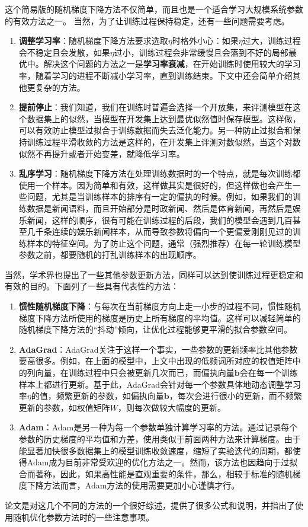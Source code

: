 \documentclass[10pt,a4paper]{ctexart}
\begin{document}
这个简易版的随机梯度下降方法不仅简单，而且也是一个适合学习大规模系统参数的有效方法之一。
当然，为了让训练过程保持稳定，还有一些问题需要考虑。
\begin{enumerate}
\item[] \textbf{调整学习率}：随机梯度下降方法要求选取$\eta$时格外小心：如果$\eta$过大，训练过程会不稳定且会发散，如果$\eta$过小，训练过程会非常缓慢且会落到不好的局部最优中。解决这个问题的方法之一是\textbf{学习率衰减}，在开始训练时使用较大的学习率，随着学习的进程不断减小学习率，直到训练结束。下文中还会简单介绍其他更复杂的方法。
\item[] \textbf{提前停止}：我们知道，我们在训练时普遍会选择一个开放集，来评测模型在这个数据集上的似然，当模型在开发集上达到最优似然值时保存模型。这样做，可以有效防止模型过拟合于训练数据而失去泛化能力。另一种防止过拟合和保持训练过程平滑收敛的方法是这样的，在开发集上评测对数似然，当这个对数似然不再提升或者开始变差，就降低学习率。
\item[] \textbf{乱序学习}：随机梯度下降方法在处理训练数据时的一个特点，就是每次训练都使用一个样本。因为简单和有效，这样做其实是很好的，但这样做也会产生一些问题，尤其是当训练样本的排序有一定的偏执的时候。例如，如果我们的训练数据是新闻语料，而且开始部分是时政新闻、然后是体育新闻，再然后是娱乐新闻，这样的顺序，很有可能在训练过程的后段，我们的模型会遇到几百甚至几千条连续的娱乐新闻样本，从而导致参数将偏向一个更偏爱刚刚见过的训练样本的特征空间。为了防止这个问题，通常（强烈推荐）在每一轮训练模型参数之前，都要随机的打乱训练样本的出现顺序。
\end{enumerate}

当然，学术界也提出了一些其他参数更新方法，同样可以达到使训练过程更稳定和有效的目的。下面列了一些具有代表性的方法：
\begin{enumerate}
\item[] \textbf{惯性随机梯度下降\cite{holyoak1987parallel}}：与每次在当前梯度方向上走一小步的过程不同，惯性随机梯度下降方法所使用的梯度是历史上所有梯度的平均值。这样可以减轻简单的随机梯度下降方法的“抖动”倾向，让优化过程能够更平滑的拟合参数空间。
\item[] \textbf{AdaGrad\cite{duchi2011adaptive}}：AdaGrad关注于这样一个事实，一些参数的更新频率比其他参数要高很多。例如，在上面的模型中，上文中出现的低频词所对应的权值矩阵中的列向量，在训练过程中只会被更新几次而已，而偏执向量$\textbf{b}$会在每一个训练样本上都进行更新。基于此，AdaGrad会针对每一个参数具体地动态调整学习率$\eta$的值，频繁更新的参数，如偏执向量$\textbf{b}$，每次会进行很小的更新，而不频繁更新的参数，如权值矩阵$W$，则每次做较大幅度的更新。
\item[] \textbf{Adam\cite{kingma2014adam}}：Adam是另一种为每一个参数单独计算学习率的方法。通过记录每个参数的历史梯度的平均值和方差，使用类似于前面两种方法来计算梯度。由于能显著加快很多数据集上的模型训练收敛速度，缩短了实验迭代的周期，都使得Adam成为目前非常受欢迎的优化方法之一。然而，该方法也因趋向于过拟合而著称，因此，如果高性能是直观重要的条件，那么，相较于标准的随机梯度下降方法而言，Adam方法的使用需要更加小心谨慎才行。
\end{enumerate}
论文\cite{ruder2016overview}是对这几个不同的方法的一个很好综述，提供了很多公式和说明，并指出了使用随机优化参数方法时的一些注意事项。
\end{document}
